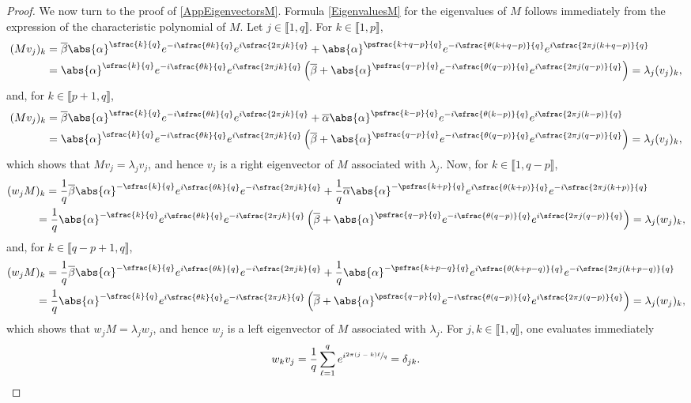 \begin{proof}
We now turn to the proof of \eqref{AppEigenvectorsM}. Formula \eqref{EigenvaluesM} for the eigenvalues of $M$ follows immediately from the expression of the characteristic polynomial of $M$. Let $j \in \llbracket 1, q\rrbracket$. For $k \in \llbracket 1, p\rrbracket$,
\begin{align*}
(M v_j)_k & = \overline\beta \abs{\alpha}^{\sfrac{k}{q}} e^{-i \sfrac{\theta k}{q}} e^{i \sfrac{2\pi j k}{q}} + \abs{\alpha}^{\psfrac{k+q-p}{q}} e^{-i \sfrac{\theta (k+q-p)}{q}} e^{i \sfrac{2\pi j (k+q-p)}{q}} \\
& = \abs{\alpha}^{\sfrac{k}{q}} e^{-i \sfrac{\theta k}{q}} e^{i \sfrac{2\pi j k}{q}} \left(\overline\beta + \abs{\alpha}^{\psfrac{q-p}{q}} e^{-i \sfrac{\theta (q-p)}{q}} e^{i \sfrac{2\pi j (q-p)}{q}}\right) = \lambda_j (v_j)_k,
\end{align*}
and, for $k \in \llbracket p+1, q\rrbracket$,
\begin{align*}
(M v_j)_k & = \overline\beta \abs{\alpha}^{\sfrac{k}{q}} e^{-i \sfrac{\theta k}{q}} e^{i \sfrac{2\pi j k}{q}} + \overline\alpha \abs{\alpha}^{\psfrac{k-p}{q}} e^{-i \sfrac{\theta (k-p)}{q}} e^{i \sfrac{2\pi j (k-p)}{q}} \\
& = \abs{\alpha}^{\sfrac{k}{q}} e^{-i \sfrac{\theta k}{q}} e^{i \sfrac{2\pi j k}{q}} \left(\overline\beta + \abs{\alpha}^{\psfrac{q-p}{q}} e^{-i \sfrac{\theta (q-p)}{q}} e^{i \sfrac{2\pi j (q-p)}{q}}\right) = \lambda_j (v_j)_k,
\end{align*}
which shows that $M v_j = \lambda_j v_j$, and hence $v_j$ is a right eigenvector of $M$ associated with $\lambda_j$. Now, for $k \in \llbracket 1, q-p\rrbracket$,
\begin{align*}
(w_j M&)_k = \frac{1}{q} \overline\beta \abs{\alpha}^{-\sfrac{k}{q}} e^{i \sfrac{\theta k}{q}} e^{-i \sfrac{2\pi j k}{q}} + \frac{1}{q} \overline\alpha \abs{\alpha}^{-\psfrac{k+p}{q}} e^{i \sfrac{\theta (k+p)}{q}} e^{-i \sfrac{2\pi j (k+p)}{q}} \\
& = \frac{1}{q} \abs{\alpha}^{-\sfrac{k}{q}} e^{i \sfrac{\theta k}{q}} e^{-i \sfrac{2\pi j k}{q}} \left(\overline\beta + \abs{\alpha}^{\psfrac{q-p}{q}} e^{-i \sfrac{\theta (q-p)}{q}} e^{i \sfrac{2\pi j (q-p)}{q}}\right) = \lambda_j (w_j)_k,
\end{align*}
and, for $k \in \llbracket q-p+1, q\rrbracket$,
\begin{align*}
(w_j M&)_k = \frac{1}{q} \overline\beta \abs{\alpha}^{-\sfrac{k}{q}} e^{i \sfrac{\theta k}{q}} e^{-i \sfrac{2\pi j k}{q}} + \frac{1}{q} \abs{\alpha}^{-\psfrac{k+p-q}{q}} e^{i \sfrac{\theta (k+p-q)}{q}} e^{-i \sfrac{2\pi j (k+p-q)}{q}} \\
& = \frac{1}{q} \abs{\alpha}^{-\sfrac{k}{q}} e^{i \sfrac{\theta k}{q}} e^{-i \sfrac{2\pi j k}{q}} \left(\overline\beta + \abs{\alpha}^{\psfrac{q-p}{q}} e^{-i \sfrac{\theta (q-p)}{q}} e^{i \sfrac{2\pi j (q-p)}{q}}\right) = \lambda_j (w_j)_k,
\end{align*}
which shows that $w_j M = \lambda_j w_j$, and hence $w_j$ is a left eigenvector of $M$ associated with $\lambda_j$. For $j, k \in \llbracket 1, q\rrbracket$, one evaluates immediately
\[
w_k v_j = \frac{1}{q} \sum_{\ell=1}^q e^{i \sfrac{2\pi (j - k) \ell}{q}} = \delta_{jk}.
\]


\end{proof}

